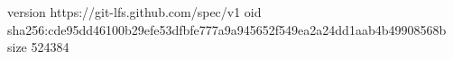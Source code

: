 version https://git-lfs.github.com/spec/v1
oid sha256:cde95dd46100b29efe53dfbfe777a9a945652f549ea2a24dd1aab4b49908568b
size 524384
